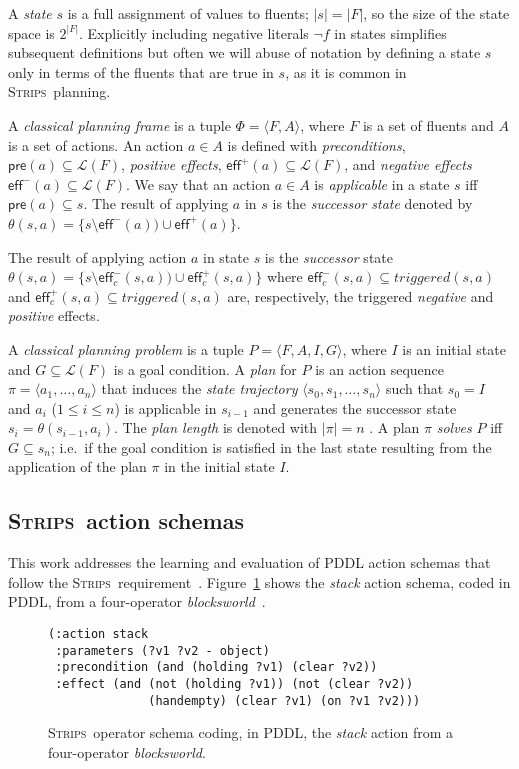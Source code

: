 \documentclass[letterpaper]{article} %
\newcommand{\tup}[1]{{\langle #1 \rangle}}
\newcommand{\pre}{\mathsf{pre}}     %
\newcommand{\eff}{\mathsf{eff}}     %
\newcommand{\strips}{\textsc{Strips}}     %
\begin{document}
A {\em state} $s$ is a full assignment of values to fluents; $|s|=|F|$, so the size of the state space is $2^{|F|}$. Explicitly including negative literals $\neg f$ in states simplifies subsequent definitions but often we will abuse of notation by defining a state $s$ only in terms of the fluents that are true in $s$, as it is common in \strips\ planning.

A {\em classical planning frame} is a tuple $\Phi=\tup{F,A}$, where $F$ is a set of fluents and $A$ is a set of actions. An action $a\in A$ is defined with {\em preconditions}, $\pre(a)\subseteq\mathcal{L}(F)$, {\em positive effects}, $\eff^+(a)\subseteq\mathcal{L}(F)$, and {\em negative effects} $\eff^-(a)\subseteq\mathcal{L}(F)$. We say that an action $a\in A$ is {\em applicable} in a state $s$ iff $\pre(a)\subseteq s$. The result of applying $a$ in $s$ is the {\em successor state} denoted by $\theta(s,a)=\{s\setminus\eff^-(a))\cup\eff^+(a)\}$.

The result of applying action $a$ in state $s$ is the {\em successor} state $\theta(s,a)=\{s\setminus\eff_c^-(s,a))\cup\eff_c^+(s,a)\}$ where $\eff_c^-(s,a)\subseteq triggered(s,a)$ and $\eff_c^+(s,a)\subseteq triggered(s,a)$ are, respectively, the triggered {\em negative} and {\em positive} effects.

A {\em classical planning problem} is a tuple $P=\tup{F,A,I,G}$, where $I$ is an initial state and $G\subseteq\mathcal{L}(F)$ is a goal condition. A {\em plan} for $P$ is an action sequence $\pi=\tup{a_1, \ldots, a_n}$ that induces the {\em state trajectory} $\tup{s_0, s_1, \ldots, s_n}$ such that $s_0=I$ and $a_i$ ({\small $1\leq i\leq n$}) is applicable in $s_{i-1}$ and generates the successor state $s_i=\theta(s_{i-1},a_i)$. The {\em plan length} is denoted with $|\pi|=n$ . A plan $\pi$ {\em solves} $P$ iff $G\subseteq s_n$; i.e.~if the goal condition is satisfied in the last state resulting from the application of the plan $\pi$ in the initial state $I$.

\subsection{\strips\ action schemas}
This work addresses the learning and evaluation of PDDL action schemas that follow the \strips\ requirement~\cite{mcdermott1998pddl,fox2003pddl2}. Figure~\ref{fig:stack} shows the {\em stack} action schema, coded in PDDL, from a four-operator {\em blocksworld}~\cite{slaney2001blocks}.

\begin{figure}[hbt!]
\begin{scriptsize}
\begin{verbatim}
(:action stack
 :parameters (?v1 ?v2 - object)
 :precondition (and (holding ?v1) (clear ?v2))
 :effect (and (not (holding ?v1)) (not (clear ?v2))
              (handempty) (clear ?v1) (on ?v1 ?v2)))
\end{verbatim}
\end{scriptsize}
 \caption{\small \strips\ operator schema coding, in PDDL, the {\em stack} action from a four-operator {\em blocksworld}.}
\label{fig:stack}
\end{figure}
\end{document}
